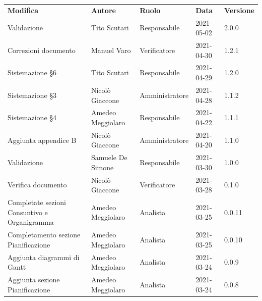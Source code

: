 \documentclass[a4paper]{article}
\begin{document}
\begin{center}
\begin{table}[h!]
    \centering
    \renewcommand{\arraystretch}{1.8}
    \begin{tabular}{p{160px} p{90px} p{70px} p{55px} p{45px}}
        \rowcolor{logo!70} \textbf{Modifica}                          & \textbf{Autore}   & \textbf{Ruolo} & \textbf{Data} & \textbf{Versione} \\
        Validazione                                                   & Tito Scutari      & Responsabile   & 2021-05-02    & 2.0.0             \\
        Correzioni documento                                          & Manuel Varo       & Verificatore   & 2021-04-30    & 1.2.1             \\
        Sistemazione \S 6                                             & Tito Scutari      & Responsabile   & 2021-04-29    & 1.2.0             \\
        Sistemazione \S 3                                             & Nicolò Giaccone   & Amministratore & 2021-04-28    & 1.1.2             \\
        Sistemazione \S 4                                             & Amedeo Meggiolaro & Responsabile   & 2021-04-22    & 1.1.1             \\
        Aggiunta appendice B                                          & Nicolò Giaccone   & Amministratore & 2021-04-20    & 1.1.0             \\
        Validazione                                                   & Samuele De Simone & Responsabile   & 2021-03-30    & 1.0.0             \\
        Verifica documento                                            & Nicolò Giaccone   & Verificatore   & 2021-03-28    & 0.1.0             \\
        Completate sezioni Consuntivo e Organigramma                  & Amedeo Meggiolaro & Analista       & 2021-03-25    & 0.0.11            \\
        Completamento sezione Pianificazione                          & Amedeo Meggiolaro & Analista       & 2021-03-25    & 0.0.10            \\
        Aggiunta diagrammi di Gantt                                   & Amedeo Meggiolaro & Analista       & 2021-03-24    & 0.0.9             \\
        Aggiunta sezione Pianificazione                               & Amedeo Meggiolaro & Analista       & 2021-03-24    & 0.0.8             \\

\end{tabular}
\end{table}
\end{center}
\end{document}
